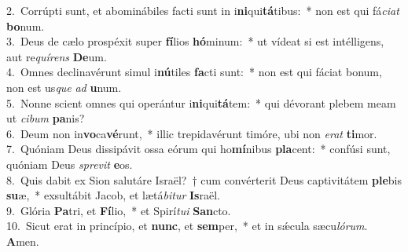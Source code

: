 {2.~}Corrúpti sunt, et abominábiles facti sunt in i\textbf{ni}qui\textbf{tá}tibus:~* non est qui fá\textit{ci}\textit{at} \textbf{bo}num.\\
{3.~}Deus de cælo prospéxit super \textbf{fí}lios \textbf{hó}minum:~* ut vídeat si est intélligens, aut re\textit{quí}\textit{rens} \textbf{De}um.\\
{4.~}Omnes declinavérunt simul i\textbf{nú}tiles \textbf{fa}cti sunt:~* non est qui fáciat bonum, non est us\textit{que} \textit{ad} \textbf{u}num.\\
{5.~}Nonne scient omnes qui operántur i\textbf{ni}qui\textbf{tá}tem:~* qui dévorant plebem meam ut \textit{ci}\textit{bum} \textbf{pa}nis?\\
{6.~}Deum non in\textbf{vo}ca\textbf{vé}runt,~* illic trepidavérunt timóre, ubi non \textit{e}\textit{rat} \textbf{ti}mor.\\
{7.~}Quóniam Deus dissipávit ossa eórum qui ho\textbf{mí}nibus \textbf{pla}cent:~* confúsi sunt, quóniam Deus \textit{spre}\textit{vit} \textbf{e}os.\\
{8.~}Quis dabit ex Sion salutáre Israël?~† cum convérterit Deus captivitátem \textbf{ple}bis \textbf{su}æ,~* exsultábit Jacob, et lætá\textit{bi}\textit{tur} \textbf{Is}raël.\\
{9.~}Glória \textbf{Pa}tri, et \textbf{Fí}lio,~* et Spirí\textit{tu}\textit{i} \textbf{San}cto.\\
{10.~}Sicut erat in princípio, et \textbf{nunc}, et \textbf{sem}per,~* et in sǽcula sæcu\textit{ló}\textit{rum}. \textbf{A}men.\\

